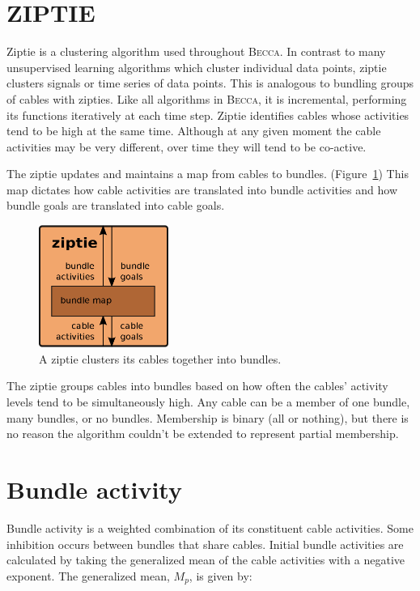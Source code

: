 \documentclass[oneside,twocolumn]{article}
\begin{document}
\section*{\color{copper} ZIPTIE}

Ziptie is a clustering algorithm used throughout \textsc{Becca}. In contrast to many unsupervised learning algorithms which cluster individual data points, ziptie clusters signals or time series of data points. This is analogous to bundling groups of cables with zipties. Like all algorithms in \textsc{Becca}, it is incremental, performing its functions iteratively at each time step. Ziptie identifies cables whose activities tend to be high at the same time. Although at any given moment the cable activities may be very different, over time they will tend to be co-active. 

The ziptie updates and maintains a map from cables to bundles. (Figure~\ref{ziptie}) This map dictates how cable activities are translated into bundle activities and how bundle goals are translated into cable goals. 

\begin{figure}[ht]
\centering
\includegraphics[height=4.0cm]{figs/ziptie.png}
\caption{A ziptie clusters its cables together into bundles.}
\label{ziptie}
\end{figure}

The ziptie groups cables into bundles based on how often the cables' activity levels tend to be simultaneously high. Any cable can be a member of one bundle, many bundles, or no bundles. Membership is binary (all or nothing), but there is no reason the algorithm couldn't be extended to represent partial membership.

\section*{\color{copper} Bundle activity}

Bundle activity is a weighted combination of its constituent cable activities. Some inhibition occurs between bundles that share cables. Initial bundle activities are calculated by taking the generalized mean of the cable activities with a negative exponent.  
The generalized mean, $M_p$, is given by:
\end{document}
